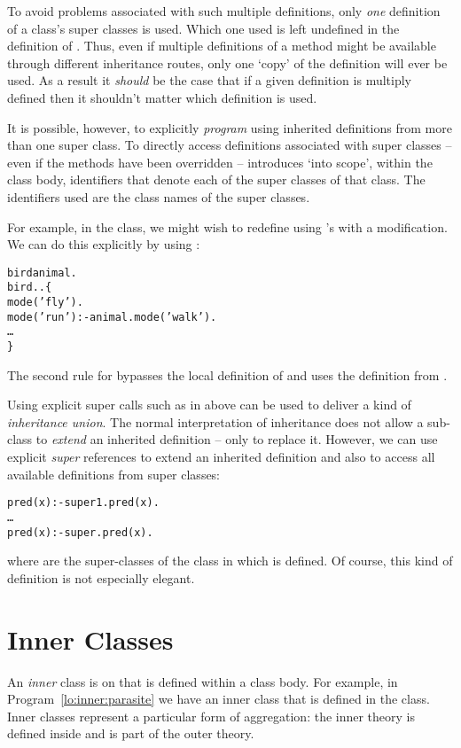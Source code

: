 To avoid problems associated with such multiple definitions, only \emph{one} definition of a class's super classes is used. Which one used is left undefined in the definition of \go. Thus, even if multiple definitions of a method might be available through different inheritance routes, only one `copy' of the definition will ever be used.  As a result it \emph{should} be the case that if a given definition is multiply defined then it shouldn't matter which definition is used.

It is possible, however, to explicitly \emph{program} using inherited definitions from more than one super class. To directly access definitions associated with super classes -- even if the methods have been overridden -- \go introduces `into scope', within the class body, identifiers that denote each of the super classes of that class. The identifiers used are the class names of the super classes.

For example, in the  class, we might wish to redefine  using 's  with a modification. We can do this explicitly by using :
\begin{alltt}
bird\classarrow{}animal.
bird..\{
  mode('fly').
  mode('run') :- animal.mode('walk').
  \ldots
\}
\end{alltt}
The second rule for  bypasses the local definition of  and uses the definition from . 

\begin{aside}
Using explicit super calls such as in  above can be used to deliver a kind of \emph{inheritance union}. The normal interpretation of inheritance does not allow a sub-class to \emph{extend} an inherited definition -- only to replace it. However, we can use explicit \emph{super} references to extend an inherited definition and also to access all available definitions from super classes:
\begin{alltt}
pred(x) :- super\sub1.pred(x).
\ldots
pred(x) :- super\subn.pred(x).
\end{alltt}
where  are the super-classes of the class in which  is defined. Of course, this kind of definition is not especially elegant.
\end{aside}

\section{Inner Classes}
\label{lo:inner}
An \emph{inner} class is on that is defined within a class body. For example, in Program~\vref{lo:inner:parasite} we have an inner  class that is defined in the  class. Inner classes represent a particular form of aggregation: the inner theory is defined inside and is part of the outer theory.

